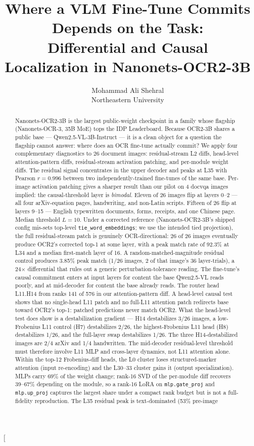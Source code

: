 \documentclass[10pt,twocolumn,letterpaper]{article}
\title{\vspace{-1.0em}Where a VLM Fine-Tune Commits Depends on the Task:\\ Differential and Causal Localization in Nanonets-OCR2-3B}
\author{Mohammad Ali Shehral\\Northeastern University}
\date{}
\begin{document}
\makeatletter
\twocolumn[
\begin{@twocolumnfalse}
\maketitle
\begin{abstract}
\noindent
Nanonets-OCR2-3B is the largest public-weight checkpoint in a family whose flagship (Nanonets-OCR-3, 35B MoE) tops the IDP Leaderboard. Because OCR2-3B shares a public base --- Qwen2.5-VL-3B-Instruct --- it is a clean object for a question the flagship cannot answer: where does an OCR fine-tune actually commit? We apply four complementary diagnostics to 26 document images: residual-stream L2 diffs, head-level attention-pattern diffs, residual-stream activation patching, and per-module weight diffs. The residual signal concentrates in the upper decoder and peaks at L35 with Pearson $r = 0.996$ between two independently-trained fine-tunes of the same base. Per-image activation patching gives a sharper result than our pilot on 4 docvqa images implied: the causal-threshold layer is \emph{bimodal}. Eleven of 26 images flip at layers 0--2 --- all four arXiv-equation pages, handwriting, and non-Latin scripts. Fifteen of 26 flip at layers 9--15 --- English typewritten documents, forms, receipts, and one Chinese page. Median threshold $L = 10$. Under a corrected reference (Nanonets-OCR2-3B's shipped config mis-sets top-level \texttt{tie\_word\_embeddings}; we use the intended tied projection), the full residual-stream patch is genuinely OCR-directional: 26 of 26 images eventually produce OCR2's corrected top-1 at some layer, with a peak match rate of 92.3\% at L34 and a median first-match layer of 16. A random-matched-magnitude residual control produces 3.85\% peak match (1/26 images, 2 of that image's 36 layer-trials), a 24$\times$ differential that rules out a generic perturbation-tolerance reading. The fine-tune's causal commitment enters at input layers for content the base Qwen2.5-VL reads poorly, and at mid-decoder for content the base already reads. The router head L11.H14 from \citet{hua2025conflicting} ranks 141 of 576 in our attention-pattern diff. A head-level causal test shows that no single-head L11 patch and no full-L11 attention patch redirects base toward OCR2's top-1: patched predictions never match OCR2. What the head-level test does show is a destabilization gradient --- H14 destabilizes 3/26 images, a low-Frobenius L11 control (H7) destabilizes 2/26, the highest-Frobenius L11 head (H8) destabilizes 1/26, and the full-layer swap destabilizes 1/26. The three H14-destabilized images are 2/4 arXiv and 1/4 handwritten. The mid-decoder residual-level threshold must therefore involve L11 MLP and cross-layer dynamics, not L11 attention alone. Within the top-12 Frobenius-diff heads, the L0 cluster loses structured-marker attention (input re-encoding) and the L30--33 cluster gains it (output specialization). MLPs carry 69\% of the weight change; rank-16 SVD of the per-module diff recovers 39--67\% depending on the module, so a rank-16 LoRA on \texttt{mlp.gate\_proj} and \texttt{mlp.up\_proj} captures the largest share under a compact rank budget but is not a full-fidelity reproduction. The L35 residual peak is text-dominated (53\% pre-image 
\end{abstract}
\end{@twocolumnfalse}
\end{document}
